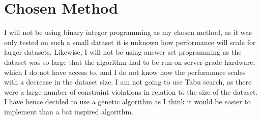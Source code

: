 \newpage

\section{Chosen Method}

I will not be using binary integer programming as my chosen method, as it was 
only tested on such a small dataset it is unknown how performance will scale for
larger datasets.
Likewise, I will not be using answer set programming as the dataset was so large
that the algorithm had to be run on server-grade hardware, which I do not have 
access to, and I do not know how the performance scales with a decrease in the 
dataset size.
I am not going to use Tabu search, as there were a large number of constraint 
violations in relation to the size of the dataset.
I have hence decided to use a genetic algorithm as I think it would be easier to
implement than a bat inspired algorithm.